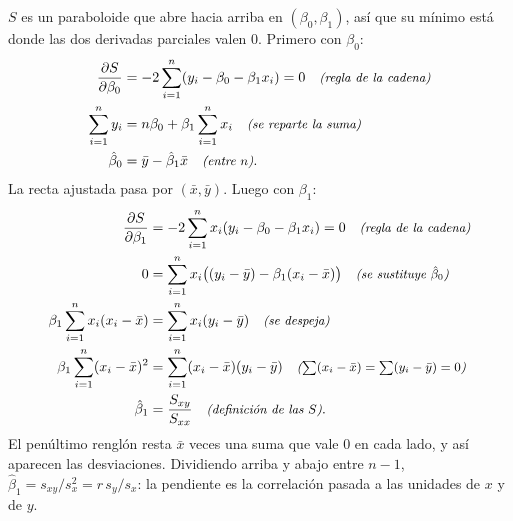 \documentclass[11pt,letterpaper]{article}
\begin{document}
$S$ es un paraboloide que abre hacia arriba en $(\beta_0, \beta_1)$,
así que su mínimo está donde las dos derivadas parciales valen $0$.
Primero con $\beta_0$:
\begin{align*}
    \frac{\partial S}{\partial \beta_0}
    &= -2 \sum_{i=1}^{n} (y_i - \beta_0 - \beta_1 x_i) = 0
       \quad\text{\small\itshape (regla de la cadena)} \\
    \sum_{i=1}^{n} y_i &= n \beta_0 + \beta_1 \sum_{i=1}^{n} x_i
       \quad\text{\small\itshape (se reparte la suma)} \\
    \hat{\beta}_0 &= \bar{y} - \hat{\beta}_1 \bar{x}
       \quad\text{\small\itshape (entre $n$)} .
\end{align*}
La recta ajustada pasa por $(\bar{x}, \bar{y})$. Luego con $\beta_1$:
\begin{align*}
    \frac{\partial S}{\partial \beta_1}
    &= -2 \sum_{i=1}^{n} x_i (y_i - \beta_0 - \beta_1 x_i) = 0
       \quad\text{\small\itshape (regla de la cadena)} \\
    0 &= \sum_{i=1}^{n} x_i \big( (y_i - \bar{y})
         - \beta_1 (x_i - \bar{x}) \big)
       \quad\text{\small\itshape (se sustituye $\hat{\beta}_0$)} \\
    \beta_1 \sum_{i=1}^{n} x_i (x_i - \bar{x})
      &= \sum_{i=1}^{n} x_i (y_i - \bar{y})
       \quad\text{\small\itshape (se despeja)} \\
    \beta_1 \sum_{i=1}^{n} (x_i - \bar{x})^2
      &= \sum_{i=1}^{n} (x_i - \bar{x})(y_i - \bar{y})
       \quad\text{\small\itshape ($\textstyle\sum (x_i - \bar{x})
              = \sum (y_i - \bar{y}) = 0$)} \\
    \hat{\beta}_1 &= \frac{S_{xy}}{S_{xx}}
       \quad\text{\small\itshape (definición de las $S$)} .
\end{align*}
El penúltimo renglón resta $\bar{x}$ veces una suma que vale $0$ en
cada lado, y así aparecen las desviaciones. Dividiendo arriba y abajo
entre $n - 1$, $\hat{\beta}_1 = s_{xy} / s_x^2 = r\, s_y / s_x$: la
pendiente es la correlación pasada a las unidades de $x$ y de $y$.
\end{document}
